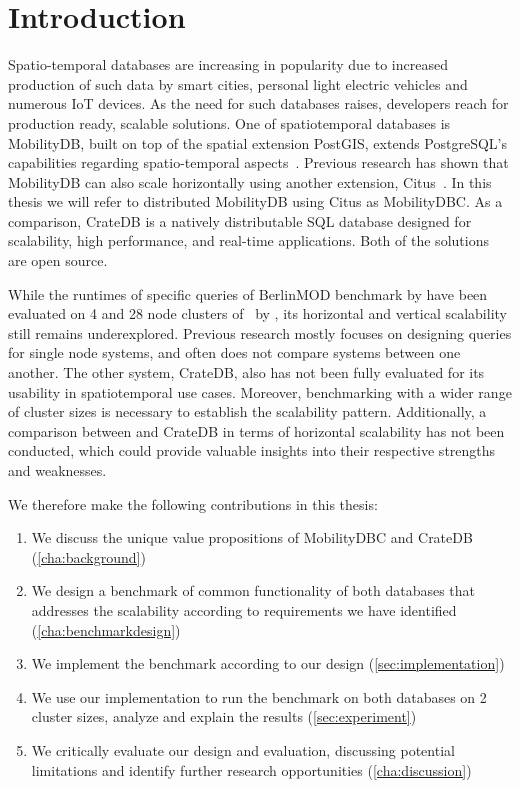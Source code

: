 \section{Introduction}
\label{cha:introduction}

Spatio-temporal databases are increasing in popularity due to increased production of such data by smart cities, personal light electric vehicles and numerous IoT devices.
As the need for such databases raises, developers reach for production ready, scalable solutions.
One of spatiotemporal databases is MobilityDB, built on top of the spatial extension PostGIS, extends PostgreSQL's capabilities regarding spatio-temporal aspects~\parencite{zimanyiMobilityDBMobilityDatabase2020}.
Previous research has shown that MobilityDB can also scale horizontally using another extension, Citus~\parencite{bakliDistributedMobilityData2020, bakliDistributedMovingObject2019, cubukcuCitusDistributedPostgreSQL2021}.
In this thesis we will refer to distributed MobilityDB using Citus as MobilityDBC.
As a comparison, CrateDB is a natively distributable SQL database designed for scalability, high performance, and real-time applications.
Both of the solutions are open source.

While the runtimes of specific queries of BerlinMOD benchmark by \textcite{duntgenBerlinMODBenchmarkMoving2009} have been evaluated on 4 and 28 node clusters of \mobilitydbc~by \parencite{bakliDistributedMobilityData2020}, its horizontal and vertical scalability still remains underexplored.
Previous research mostly focuses on designing queries for single node systems, and often does not compare systems between one another.
The other system, CrateDB, also has not been fully evaluated for its usability in spatiotemporal use cases.
Moreover, benchmarking with a wider range of cluster sizes is necessary to establish the scalability pattern.
Additionally, a comparison between \mobilitydbc and CrateDB in terms of horizontal scalability has not been conducted, which could provide valuable insights into their respective strengths and weaknesses.

We therefore make the following contributions in this thesis:
\begin{enumerate}
	\item We discuss the unique value propositions of MobilityDBC and CrateDB (\cref{cha:background})
	\item We design a benchmark of common functionality of both databases that addresses the scalability according to requirements we have identified (\cref{cha:benchmarkdesign})
	\item We implement the benchmark according to our design (\cref{sec:implementation})
	\item We use our implementation to run the benchmark on both databases on 2 cluster sizes, analyze and explain the results (\cref{sec:experiment})
	\item We critically evaluate our design and evaluation, discussing potential limitations and identify further research opportunities (\cref{cha:discussion})
\end{enumerate}
